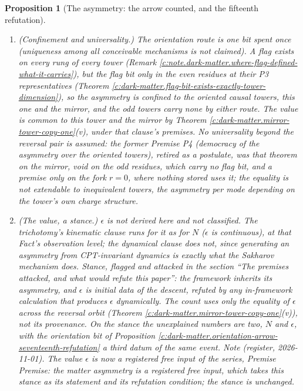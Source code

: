 \documentclass[11pt]{article}
\newtheorem{proposition}[theorem]{Proposition}
\theoremstyle{definition}
\theoremstyle{plain}
\begin{document}
\begin{proposition}[The asymmetry: the arrow counted, and the fifteenth refutation]
\begin{enumerate}
\item[(iii)] \emph{(Confinement and universality.)} The orientation route is one bit spent once (uniqueness among all conceivable mechanisms is not claimed). A flag exists on every rung of every tower (Remark \ref{c:note.dark-matter.where-flag-defined-what-it-carries}), but the flag \emph{bit} only in the even residues at their P3 representatives (Theorem \ref{c:dark-matter.flag-bit-exists-exactly-tower-dimension}), so the asymmetry is confined to the oriented causal towers, this one and the mirror, and the odd towers carry none by either route. The value is common to this tower and the mirror by Theorem \ref{c:dark-matter.mirror-tower-copy-one}(v), under that clause's premises. No universality beyond the reversal pair is assumed: the former Premise P4 (democracy of the asymmetry over the oriented towers), retired as a postulate, was that theorem on the mirror, void on the odd residues, which carry no flag bit, and a premise only on the fork $r = 0$, where nothing stored uses it; the equality is not extendable to inequivalent towers, the asymmetry per mode depending on the tower's own charge structure.
\item[(iv)] \emph{(The value, a stance.)} $\epsilon$ is not derived here and not classified. The trichotomy's kinematic clause runs for it as for $N$ ($\epsilon$ is continuous), at that Fact's observation level; the dynamical clause does not, since generating an asymmetry from CPT-invariant dynamics is exactly what the Sakharov mechanism does. \emph{Stance, flagged and attacked in the section ``The premises attacked, and what would refute this paper'':} the framework inherits its asymmetry, and $\epsilon$ is initial data of the descent, refuted by any in-framework calculation that produces $\epsilon$ dynamically. The count uses only the equality of $\epsilon$ across the reversal orbit (Theorem \ref{c:dark-matter.mirror-tower-copy-one}(v)), not its provenance. On the stance the unexplained numbers are two, $N$ and $\epsilon$, with the orientation bit of Proposition \ref{c:dark-matter.orientation-arrow-seventeenth-refutation} a third datum of the same event. \emph{Note (register, 2026-11-01).} The value $\epsilon$ is now a registered free input of the series, Premise \emph{Premise: the matter asymmetry is a registered free input}, which takes this stance as its statement and its refutation condition; the stance is unchanged.
\end{enumerate}
\end{proposition}
\end{document}
